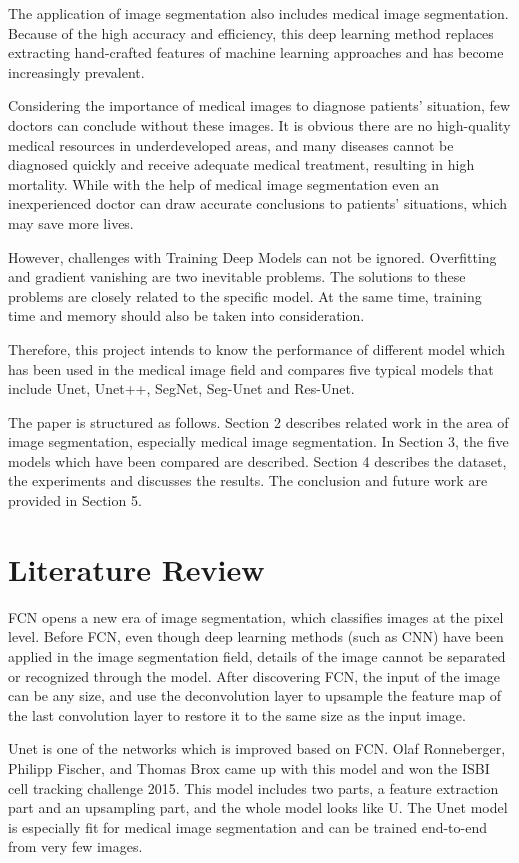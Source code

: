 \documentclass{article}
\begin{document}
The application of image segmentation also includes medical image segmentation.
Because of the high accuracy and efficiency, this deep learning method replaces extracting hand-crafted features of machine learning approaches and has become increasingly prevalent.\cite{hesamian2019deep}

Considering the importance of medical images to diagnose patients' situation, few doctors can conclude without these images.
It is obvious there are no high-quality medical resources in underdeveloped areas, and many diseases cannot be diagnosed quickly and receive adequate medical treatment, resulting in high mortality.
While with the help of medical image segmentation even an inexperienced doctor can draw accurate conclusions to patients' situations, which may save more lives.\cite{jin2019dunet}

However, challenges with Training Deep Models can not be ignored.
Overfitting and gradient vanishing are two inevitable problems.
The solutions to these problems are closely related to the specific model.
At the same time, training time and memory should also be taken into consideration.

Therefore, this project intends to know the performance of different model which has been used in the medical image field and compares five typical models that include Unet, Unet++, SegNet, Seg-Unet and Res-Unet.

The paper is structured as follows.
Section 2 describes related work in the area of image segmentation, especially medical image segmentation.
In Section 3, the five models which have been compared are described.
Section 4 describes the dataset, the experiments and discusses the results.
The conclusion and future work are provided in Section 5.


\section{Literature Review}
FCN opens a new era of image segmentation, which classifies images at the pixel level.
Before FCN, even though deep learning methods (such as CNN) have been applied in the image segmentation field, details of the image cannot be separated or recognized through the model.
After discovering FCN, the input of the image can be any size, and use the deconvolution layer to upsample the feature map of the last convolution layer to restore it to the same size as the input image. \cite{Long_2015_CVPR}

Unet is one of the networks which is improved based on FCN.
Olaf Ronneberger, Philipp Fischer, and Thomas Brox came up with this model and won the ISBI cell tracking challenge 2015.
This model includes two parts, a feature extraction part and an upsampling part, and the whole model looks like U.
The Unet model is especially fit for medical image segmentation and can be trained end-to-end from very few images.\cite{DBLP:journals/corr/RonnebergerFB15}
\end{document}

